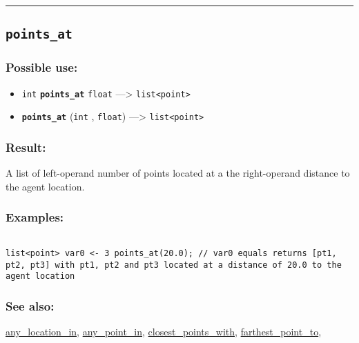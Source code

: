 \documentclass[]{book}
\providecommand{\tightlist}{%
  \setlength{\itemsep}{0pt}\setlength{\parskip}{0pt}}
\theoremstyle{definition}
\theoremstyle{definition}
\theoremstyle{definition}
\theoremstyle{remark}
\begin{document}
\begin{center}\rule{0.5\linewidth}{\linethickness}\end{center}

\subsection{\texorpdfstring{\texttt{points\_at}}{points\_at}}\label{points_at}

\subsubsection{Possible use:}\label{possible-use-410}

\begin{itemize}
\tightlist
\item
  \texttt{int} \textbf{\texttt{points\_at}} \texttt{float}
  ---\textgreater{} \texttt{list\textless{}point\textgreater{}}
\item
  \textbf{\texttt{points\_at}} (\texttt{int} , \texttt{float})
  ---\textgreater{} \texttt{list\textless{}point\textgreater{}}
\end{itemize}

\subsubsection{Result:}\label{result-396}

A list of left-operand number of points located at a the right-operand
distance to the agent location.

\subsubsection{Examples:}\label{examples-284}

\begin{verbatim}
 
list<point> var0 <- 3 points_at(20.0); // var0 equals returns [pt1, pt2, pt3] with pt1, pt2 and pt3 located at a distance of 20.0 to the agent location
\end{verbatim}

\subsubsection{See also:}\label{see-also-163}

\href{OperatorsAA\#any_location_in}{any\_location\_in},
\href{OperatorsAA\#any_point_in}{any\_point\_in},
\href{OperatorsBC\#closest_points_with}{closest\_points\_with},
\href{OperatorsDH\#farthest_point_to}{farthest\_point\_to},
\end{document}
